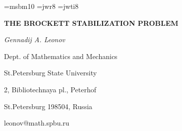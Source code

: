 
\topmargin=-10mm
\oddsidemargin=-5mm
\evensidemargin=-5mm
\textwidth 16cm
\textheight 23cm
\hfuzz=1.5pt
\makeindex

\font\msbm=msbm10
\font\wr=jwr8
\font\wit=jwti8

\def\al {\alpha}
\def\be {\beta}
\def\br {\hbox{\msbm R}}
\def\de {\delta}
\def\e  {\eta}
\def\ga {\gamma}
\def\f  {\frac}
\def\la {\lambda}
\def\liml{\lim\limits}
\def\om {\omega}
\def\sg {\sigma}
\def\t  {\tau}
\def\ve {\varepsilon}




\pagestyle{plain}
\large

\begin{center} {\bf
THE BROCKETT STABILIZATION PROBLEM
}
\end{center}

\centerline{\it Gennadij A. Leonov}

\medskip

\centerline{Dept. of Mathematics and Mechanics}
\centerline{St.Petersburg State University}
\centerline{2, Bibliotechnaya pl., Peterhof}
\centerline{St.Petersburg 198504, Russia}
\centerline{leonov@math.spbu.ru}

\bigskip

\bigskip

